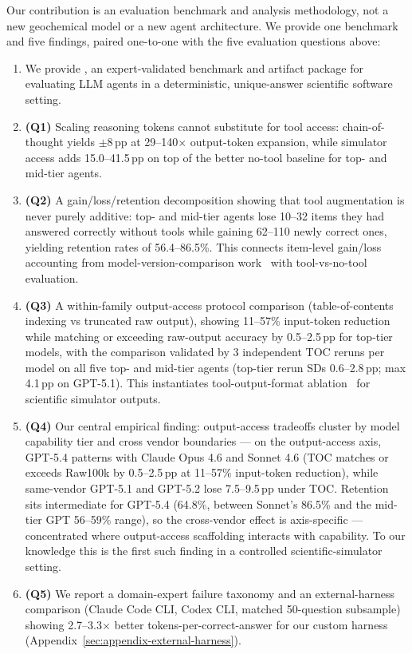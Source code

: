 \documentclass{article}
\begin{document}
Our contribution is an evaluation benchmark and analysis methodology, not a new geochemical model or a new agent architecture. We provide one benchmark and five findings, paired one-to-one with the five evaluation questions above:
\begin{enumerate}[leftmargin=*, itemsep=2pt]
    \item We provide \BenchName, an expert-validated benchmark and artifact package for evaluating LLM agents in a deterministic, unique-answer scientific software setting.
    \item \textbf{(Q1)} Scaling reasoning tokens cannot substitute for tool access: chain-of-thought yields $\pm 8$\,pp at 29--140$\times$ output-token expansion, while simulator access adds 15.0--41.5\,pp on top of the better no-tool baseline for top- and mid-tier agents.
    \item \textbf{(Q2)} A gain/loss/retention decomposition showing that tool augmentation is never purely additive: top- and mid-tier agents lose 10--32 items they had answered correctly without tools while gaining 62--110 newly correct ones, yielding retention rates of 56.4--86.5\%. This connects item-level gain/loss accounting from model-version-comparison work~\citep{rci2026} with tool-vs-no-tool evaluation.
    \item \textbf{(Q3)} A within-family output-access protocol comparison (table-of-contents indexing vs truncated raw output), showing 11--57\% input-token reduction while matching or exceeding raw-output accuracy by 0.5--2.5\,pp for top-tier models, with the comparison validated by 3 independent TOC reruns per model on all five top- and mid-tier agents (top-tier rerun SDs 0.6--2.8\,pp; max 4.1\,pp on GPT-5.1). This instantiates tool-output-format ablation~\citep{toolouts2025} for scientific simulator outputs.
    \item \textbf{(Q4)} Our central empirical finding: output-access tradeoffs cluster by model capability tier and cross vendor boundaries --- on the output-access axis, GPT-5.4 patterns with Claude Opus 4.6 and Sonnet 4.6 (TOC matches or exceeds Raw100k by 0.5--2.5\,pp at 11--57\% input-token reduction), while same-vendor GPT-5.1 and GPT-5.2 lose 7.5--9.5\,pp under TOC. Retention sits intermediate for GPT-5.4 (64.8\%, between Sonnet's 86.5\% and the mid-tier GPT 56--59\% range), so the cross-vendor effect is axis-specific --- concentrated where output-access scaffolding interacts with capability. To our knowledge this is the first such finding in a controlled scientific-simulator setting.
    \item \textbf{(Q5)} We report a domain-expert failure taxonomy and an external-harness comparison (Claude Code CLI, Codex CLI, matched 50-question subsample) showing 2.7--3.3$\times$ better tokens-per-correct-answer for our custom harness (Appendix~\ref{sec:appendix-external-harness}).
\end{enumerate}
\end{document}
